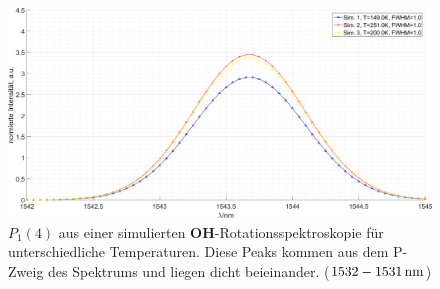 \documentclass[numbers=noenddot,a4paper,notitlepage,twoside,BCOR15mm]{scrartcl}
\newcommand{\ix}[1]{_\text{#1}}
\newcommand{\fett}[1]{\textbf{#1}}
\begin{document}
					\begin{figure}
						\centering
						\includegraphics[width=\textwidth]{p5_sim_spektr.png}
						\caption{$P\ix{1}(4)$ aus einer simulierten \fett{OH}-Rotationsspektroskopie für unterschiedliche Temperaturen. Diese Peaks kommen aus dem P-Zweig des Spektrums und liegen dicht beieinander. ($\unit[1532-1531]{nm}$)}
						\label{img:p5}
					\end{figure}

		
		
\end{document}

